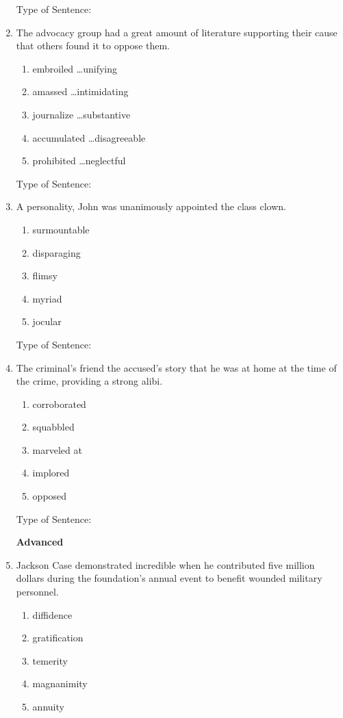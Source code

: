 \begin{enumerate}
Type of Sentence:\hrulefill

\bigskip
\item The advocacy group had \longline a great amount of literature supporting their cause that others found it \longline to oppose them. 
\begin{enumerate}[label=(\Alph*)]
\item embroiled \ldots unifying
\item amassed \ldots intimidating 
\item journalize \ldots substantive
\item accumulated \ldots disagreeable
\item prohibited \ldots neglectful
\end{enumerate}

Type of Sentence:\hrulefill

\bigskip
\item A \longline personality, John was unanimously appointed the class clown. 
\begin{enumerate}[label=(\Alph*)]
\item surmountable
\item disparaging
\item flimsy
\item myriad 
\item jocular
\end{enumerate}

Type of Sentence:\hrulefill

\bigskip
\item The criminal's friend \longline the accused's story that he was at home at the time of the crime, providing a strong alibi. 
\begin{enumerate}[label=(\Alph*)]
\item corroborated 
\item squabbled
\item marveled at
\item implored
\item opposed
\end{enumerate}

Type of Sentence:\hrulefill

\textbf{Advanced}

\bigskip
\item Jackson Case demonstrated incredible \longline when he contributed five million dollars during the foundation's annual event to benefit wounded military personnel. 
\begin{enumerate}[label=(\Alph*)]
\item diffidence 
\item gratification
\item temerity
\item magnanimity 
\item annuity 
\end{enumerate}


\end{enumerate}
